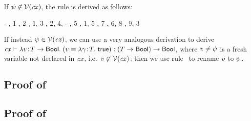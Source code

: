 If $\psi\not\in\mathcal{V}(\mathit{cx})$, the rule is derived as follows:
\begin{derivation}
\step{\istyO{\typ}}
     {\hyp}
\step{\cxwfO}
     {, 1}
\step{\istyO{\bool}}
     {\Rtbool, 2}
\step{\istyO{\tarr{\typ}{\bool}}}
     {\Rtarr, 1, 3}
\step{\cxwf{\snoc{\cx}{\vdec{\varfxpred}{\tarr{\typ}{\bool}}}}}
     {\Rcxvdec, 2, 4, \hyp}
\step{\hasty{\snoc{\cx}{\vdec{\varfxpred}{\tarr{\typ}{\bool}}}}
            {\varfxpred}{\tarr{\typ}{\bool}}}
     {\Revar, 5}
\step{\isty{\snoc{\cx}{\vdec{\varfxpred}{\tarr{\typ}{\bool}}}}{\typ}}
     {, 1, 5}
\step{\hasty{\snoc{\cx}{\vdec{\varfxpred}{\tarr{\typ}{\bool}}}}
            {\abs{\varfx}{\typ}{\true}}{\tarr{\typ}{\bool}}}
     {\Reconsttrue, 7}
\step{\hasty{\snoc{\cx}{\vdec{\varfxpred}{\tarr{\typ}{\bool}}}}
            {\eq{\varfxpred}{\abs{\varfx}{\typ}{\true}}}{\bool}}
     {\Reeq, 6, 8}
\step{\hastyO{\abs{\varfxpred}
                  {\tarr{\typ}{\bool}}
                  {(\eq{\varfxpred}{\abs{\varfx}{\typ}{\true}})}}
             {\tarr{(\tarr{\typ}{\bool})}{\bool}}}
     {\Reabs, 9, 3}
\end{derivation}
If instead $\psi\in\mathcal{V}(\mathit{cx})$, we can use a very analogous derivation to
derive
$\mathit{cx}\vdash\lambda v\!:\!T\to\mathsf{Bool}.\;(v\equiv\lambda\gamma\!:\!T.\;\mathsf{true}):(T\to\mathsf{Bool})\to\mathsf{Bool}$, where $v\neq\psi$ is a fresh
variable not declared in $\mathit{cx}$, i.e.\ $v\not\in\mathcal{V}(\mathit{cx})$; then we use rule
\Reabsalpha\ to rename $v$ to $\psi$.



\subsection*{Proof of }

\begin{derivation}
\step{\hasty{\snoc{\cx}{\vdecO}}{\expr}{\bool}}{\hyp}
\end{derivation}



\subsection*{Proof of }

